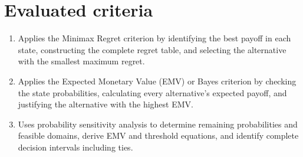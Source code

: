 	\section*{Evaluated criteria}
	\begin{enumerate}[label=\textbf{C\arabic*},start=5]
		\item Applies the Minimax Regret criterion by identifying the best payoff in each state, constructing the complete regret table, and selecting the alternative with the smallest maximum regret.
		\item Applies the Expected Monetary Value (EMV) or Bayes criterion by checking the state probabilities, calculating every alternative's expected payoff, and justifying the alternative with the highest EMV.
		\item Uses probability sensitivity analysis to determine remaining probabilities and feasible domains, derive EMV and threshold equations, and identify complete decision intervals including ties.
	\end{enumerate}

